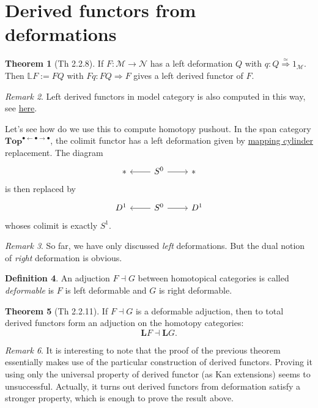 \documentclass[11pt]{article}
\theoremstyle{definition}
\newtheorem{theorem}{Theorem}[part]
\newtheorem{definition}[theorem]{Definition}
\theoremstyle{remark}
\newtheorem{remark}[theorem]{Remark}
\newcommand{\Top}{\mathbf{Top}}
\newcommand{\calM}{\mathcal{M}}
\newcommand{\calN}{\mathcal{N}}
\begin{document}
\section{Derived functors from deformations}

\begin{theorem}[Th 2.2.8]\label{derived-functor-from-deformation}
    If $F : \calM \to \calN$ has a left deformation $Q$ with $q : Q \stackrel{\simeq}{\Rightarrow} 1_{\calM}$.
    Then $\mathbb L F := FQ$ with $Fq : FQ \Rightarrow F$ gives a left derived functor of $F$.
\end{theorem}

\begin{remark}
    Left derived functors in model category is also computed in this way,
    see \href{https://ncatlab.org/nlab/show/derived+functor#on_homotopy_categories}{here}.
\end{remark}

Let's see how do we use this to compute homotopy pushout.
In the span category $\Top^{\bullet \leftarrow \bullet \rightarrow \bullet}$,
the colimit functor has a left deformation given by
\href{https://ncatlab.org/nlab/show/mapping+cylinder}{mapping cylinder} replacement.
The diagram
\[
\begin{tikzcd}
    * & S ^ 0 \arrow[l] \arrow[r] & *
\end{tikzcd}
\]
is then replaced by
\[
\begin{tikzcd}
    D^1 & S ^ 0 \arrow[l] \arrow[r] & D^1
\end{tikzcd}
\]
whoses colimit is exactly $S^1$.

\begin{remark}
    So far, we have only discussed \emph{left} deformations.
    But the dual notion of \emph{right} deformation is obvious.
\end{remark}

\begin{definition}
    An adjuction $F \dashv G$ between homotopical categories is called \emph{deformable}
    is $F$ is left deformable and $G$ is right deformable.
\end{definition}

\begin{theorem}[Th 2.2.11]
    If $F \dashv G$ is a deformable adjuction, then to total derived functors form an adjuction on the homotopy categories:
    $$\mathbf{L}F \dashv \mathbf{L}G.$$
\end{theorem}

\begin{remark}
    It is interesting to note that the proof of the previous theorem essentially makes use of the particular construction of
    derived functors. Proving it using only the universal property of derived functor (as Kan extensions) seems to unsuccessful.
    Actually, it turns out derived functors from deformation satisfy a stronger property, which is enough to prove the result above. 
\end{remark}
\end{document}
